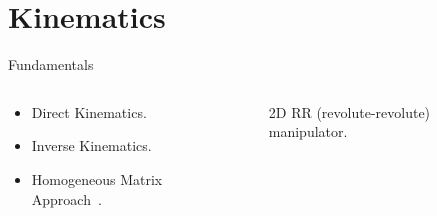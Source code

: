\section{Kinematics}

\begin{frame}{Fundamentals}
\begin{columns}
    \begin{column}{0.5\textwidth}
        \begin{itemize}
            \item Direct Kinematics.
            \item Inverse Kinematics.
            \item Homogeneous Matrix Approach~\cite{hma1}.
        \end{itemize}
    \end{column}
    \begin{column}{0.5\textwidth}
        \begin{figure}
            \centering
            \scalebox{0.6}{}
            \caption{2D RR (revolute-revolute) manipulator.}
          \end{figure}
    \end{column}
\end{columns}
\end{frame}

